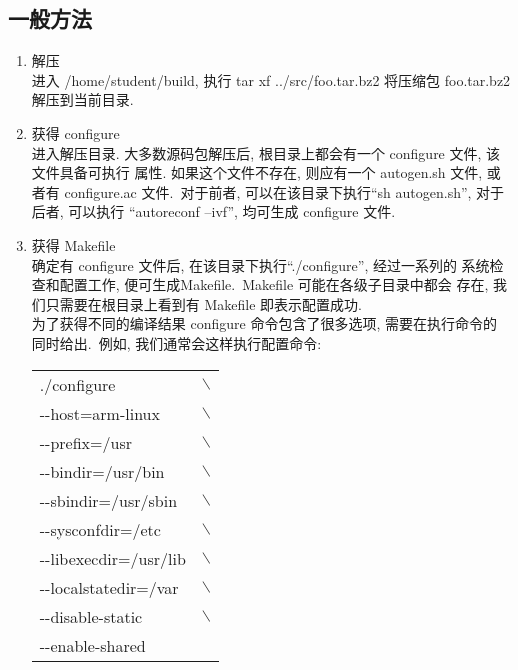 \subsection{一般方法}
\begin{enumerate}
  \item 解压\\
      进入 /home/student/build, 执行 tar xf ../src/foo.tar.bz2 将压缩包
      foo.tar.bz2 解压到当前目录.
  \item 获得 configure\\
      进入解压目录.
      大多数源码包解压后, 根目录上都会有一个 configure 文件, 该文件具备可执行
      属性. 如果这个文件不存在, 则应有一个 autogen.sh 文件, 或者有
      configure.ac 文件.~对于前者, 可以在该目录下执行``sh autogen.sh'',
      对于后者, 可以执行 ``autoreconf --ivf'', 均可生成 configure 文件.
  \item 获得 Makefile\\
      确定有 configure 文件后, 在该目录下执行``./configure'', 经过一系列的
      系统检查和配置工作, 便可生成Makefile.~Makefile 可能在各级子目录中都会
      存在, 我们只需要在根目录上看到有 Makefile 即表示配置成功.\\
      为了获得不同的编译结果 configure 命令包含了很多选项, 需要在执行命令的
      同时给出.~例如, 我们通常会这样执行配置命令:

    \begin{boxedminipage}{.8\textwidth}
        \begin{tabular}{ll}
            ./configure           &$\backslash$\\
            \qquad -{}-host=arm-linux      &$\backslash$\\
            \qquad -{}-prefix=/usr         &$\backslash$\\
            \qquad -{}-bindir=/usr/bin     &$\backslash$\\
            \qquad -{}-sbindir=/usr/sbin   &$\backslash$\\
            \qquad -{}-sysconfdir=/etc     &$\backslash$\\
            \qquad -{}-libexecdir=/usr/lib &$\backslash$\\
            \qquad -{}-localstatedir=/var  &$\backslash$\\
            \qquad -{}-disable-static      &$\backslash$\\
            \qquad -{}-enable-shared       &
        \end{tabular}
    \end{boxedminipage}


\end{enumerate}
